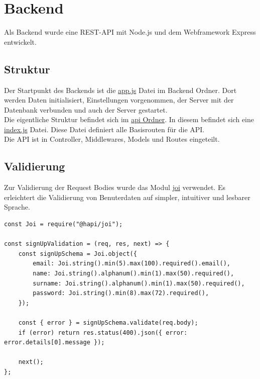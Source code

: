 \chapter{Backend}\label{ch:backend}
Als Backend wurde eine REST-API mit Node.js und dem Webframework Express entwickelt.

\section{Struktur}
Der Startpunkt des Backends ist die \hyperlink{https://github.com/Drinkler/Online-Shop/blob/master/backend/app.js}{app.js} Datei im Backend Ordner. Dort werden Daten initialisiert, Einstellungen vorgenommen, der Server mit der Datenbank verbunden und auch der Server gestartet.\\
Die eigentliche Struktur befindet sich im \hyperlink{https://github.com/Drinkler/Online-Shop/blob/master/backend/api}{api Ordner}. In diesem befindet sich eine \hyperlink{https://github.com/Drinkler/Online-Shop/blob/master/backend/api/index.js}{index.js} Datei. Diese Datei definiert alle Basisrouten für die API.\\
Die API ist in Controller, Middlewares, Models und Routes eingeteilt. 

\section{Validierung}
Zur Validierung der Request Bodies wurde das Modul \hyperlink{https://hapi.dev/module/joi/}{joi} verwendet. Es erleichtert die Validierung von Benuterdaten auf simpler, intuitiver und lesbarer Sprache.

\begin{lstlisting}[caption={Validierung des Sign ups (backend > api > middleware > validation.js)}]
const Joi = require("@hapi/joi");

const signUpValidation = (req, res, next) => {
    const signUpSchema = Joi.object({
        email: Joi.string().min(5).max(100).required().email(),
        name: Joi.string().alphanum().min(1).max(50).required(),
        surname: Joi.string().alphanum().min(1).max(50).required(),
        password: Joi.string().min(8).max(72).required(),
    });

    const { error } = signUpSchema.validate(req.body);
    if (error) return res.status(400).json({ error: error.details[0].message });

    next();
};
\end{lstlisting}

